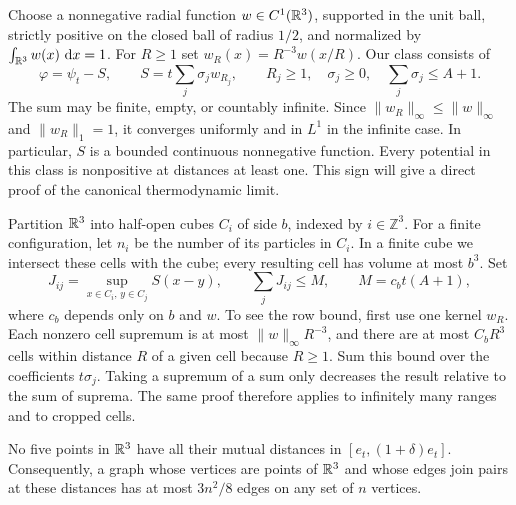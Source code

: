 Choose a nonnegative radial function $w\in C^1(\mathbb R^3)$, supported in the
unit ball, strictly positive on the closed ball of radius $1/2$, and
normalized by $\int_{\mathbb R^3}w(x)\,\,\mathrm d x=1$. For $R\ge1$ set
$w_R(x)=R^{-3}w(x/R)$. Our class consists of
\begin{equation}
 \varphi=\psi_t-S,
 \qquad S=t\sum_j\sigma_j w_{R_j},
 \qquad R_j\ge1,\quad \sigma_j\ge0,
 \quad \sum_j\sigma_j\le A+1.
 \label{eq:physical-class}
\end{equation}
The sum may be finite, empty, or countably infinite. Since
$\|w_R\|_\infty\le\|w\|_\infty$ and $\|w_R\|_1=1$, it converges
uniformly and in $L^1$ in the infinite case. In particular, $S$ is a
bounded continuous nonnegative function. Every potential in this class is
nonpositive at distances at least one. This sign will give a direct proof
of the canonical thermodynamic limit.

Partition $\mathbb R^3$ into half-open cubes $C_i$ of side $b$, indexed by
$i\in\mathbb Z^3$. For a finite configuration, let $n_i$ be the number
of its particles in $C_i$. In a finite cube we intersect these cells with
the cube; every resulting cell has volume at most $b^3$. Set
\begin{equation}
 J_{ij}=\sup_{x\in C_i,\,y\in C_j}S(x-y),
 \qquad \sum_jJ_{ij}\le M,
 \qquad M=c_b t(A+1),
 \label{eq:cell-row}
\end{equation}
where $c_b$ depends only on $b$ and $w$. To see the row bound, first use
one kernel $w_R$. Each nonzero cell supremum is at most
$\|w\|_\infty R^{-3}$, and there are at most $C_bR^3$ cells within
distance $R$ of a given cell because $R\ge1$. Sum this bound over the
coefficients $t\sigma_j$. Taking a supremum of a sum only decreases the
result relative to the sum of suprema. The same proof therefore applies
to infinitely many ranges and to cropped cells.

\begin{lemma}
\label{lem:shell-graph}
No five points in $\mathbb R^3$ have all their mutual distances in
$[e_t,(1+\delta)e_t]$. Consequently, a graph whose vertices are points
of $\mathbb R^3$ and whose edges join pairs at these distances has at most
$3n^2/8$ edges on any set of $n$ vertices.
\end{lemma}

